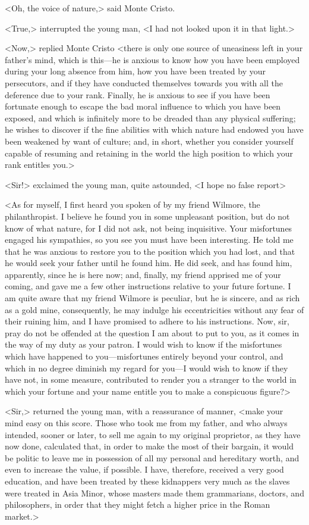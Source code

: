  <Oh, the voice of nature,> said Monte Cristo. 

 <True,> interrupted the young man, <I had not looked upon it in that light.> 

 <Now,> replied Monte Cristo <there is only one source of uneasiness left in your father's mind, which is this—he is anxious to know how you have been employed during your long absence from him, how you have been treated by your persecutors, and if they have conducted themselves towards you with all the deference due to your rank. Finally, he is anxious to see if you have been fortunate enough to escape the bad moral influence to which you have been exposed, and which is infinitely more to be dreaded than any physical suffering; he wishes to discover if the fine abilities with which nature had endowed you have been weakened by want of culture; and, in short, whether you consider yourself capable of resuming and retaining in the world the high position to which your rank entitles you.> 

 <Sir!> exclaimed the young man, quite astounded, <I hope no false report\longdash> 

 <As for myself, I first heard you spoken of by my friend Wilmore, the philanthropist. I believe he found you in some unpleasant position, but do not know of what nature, for I did not ask, not being inquisitive. Your misfortunes engaged his sympathies, so you see you must have been interesting. He told me that he was anxious to restore you to the position which you had lost, and that he would seek your father until he found him. He did seek, and has found him, apparently, since he is here now; and, finally, my friend apprised me of your coming, and gave me a few other instructions relative to your future fortune. I am quite aware that my friend Wilmore is peculiar, but he is sincere, and as rich as a gold mine, consequently, he may indulge his eccentricities without any fear of their ruining him, and I have promised to adhere to his instructions. Now, sir, pray do not be offended at the question I am about to put to you, as it comes in the way of my duty as your patron. I would wish to know if the misfortunes which have happened to you—misfortunes entirely beyond your control, and which in no degree diminish my regard for you—I would wish to know if they have not, in some measure, contributed to render you a stranger to the world in which your fortune and your name entitle you to make a conspicuous figure?> 

 <Sir,> returned the young man, with a reassurance of manner, <make your mind easy on this score. Those who took me from my father, and who always intended, sooner or later, to sell me again to my original proprietor, as they have now done, calculated that, in order to make the most of their bargain, it would be politic to leave me in possession of all my personal and hereditary worth, and even to increase the value, if possible. I have, therefore, received a very good education, and have been treated by these kidnappers very much as the slaves were treated in Asia Minor, whose masters made them grammarians, doctors, and philosophers, in order that they might fetch a higher price in the Roman market.> 

